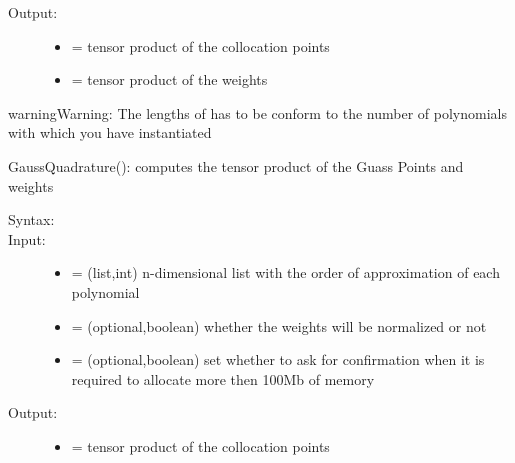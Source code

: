 \documentclass[letterpaper,10pt,english]{sphinxmanual}
\begin{document}
\begin{fulllineitems}
\begin{fulllineitems}
\begin{description}
\item[{Output:}] \leavevmode\begin{itemize}
\item {} 
 = tensor product of the collocation points

\item {} 
 = tensor product of the weights

\end{itemize}

\end{description}

\begin{notice}{warning}{Warning:}
The lengths of  has to be conform to the number of polynomials with which you have instantiated 
\end{notice}

\end{fulllineitems}


\begin{fulllineitems}
\label{index:SpectralToolbox.SpectralND.PolyND.GaussQuadrature}
GaussQuadrature(): computes the tensor product of the Guass Points and weights
\begin{description}
\item[{Syntax:}] \leavevmode
{}

\item[{Input:}] \leavevmode\begin{itemize}
\item {} 
 = (list,int) n-dimensional list with the order of approximation of each polynomial

\item {} 
 = (optional,boolean) whether the weights will be normalized or not

\item {} 
 = (optional,boolean) set whether to ask for confirmation when it is required to allocate more then 100Mb of memory

\end{itemize}

\item[{Output:}] \leavevmode\begin{itemize}
\item {} 
 = tensor product of the collocation points


\end{itemize}
\end{description}
\end{fulllineitems}
\end{fulllineitems}
\end{document}
